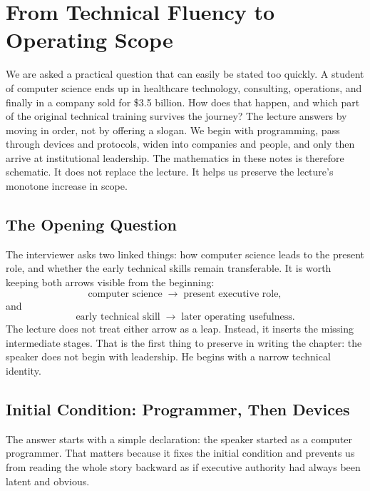 \chapter{From Technical Fluency to Operating Scope}

We are asked a practical question that can easily be stated too quickly. A student of computer science ends up in healthcare technology, consulting, operations, and finally in a company sold for \$3.5 billion. How does that happen, and which part of the original technical training survives the journey? The lecture answers by moving in order, not by offering a slogan. We begin with programming, pass through devices and protocols, widen into companies and people, and only then arrive at institutional leadership. The mathematics in these notes is therefore schematic. It does not replace the lecture. It helps us preserve the lecture's monotone increase in scope.

\section{The Opening Question}

The interviewer asks two linked things: how computer science leads to the present role, and whether the early technical skills remain transferable. It is worth keeping both arrows visible from the beginning:
\begin{equation}
\text{computer science} \;\to\; \text{present executive role},
\end{equation}
and
\begin{equation}
\text{early technical skill} \;\to\; \text{later operating usefulness}.
\end{equation}
The lecture does not treat either arrow as a leap. Instead, it inserts the missing intermediate stages. That is the first thing to preserve in writing the chapter: the speaker does not begin with leadership. He begins with a narrow technical identity.

\section{Initial Condition: Programmer, Then Devices}

The answer starts with a simple declaration: the speaker started as a computer programmer. That matters because it fixes the initial condition and prevents us from reading the whole story backward as if executive authority had always been latent and obvious.

